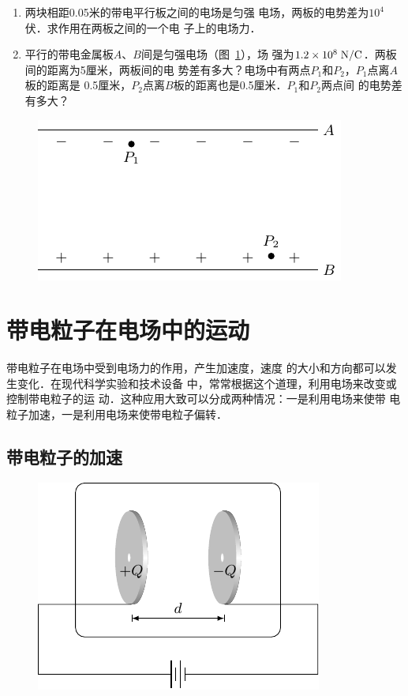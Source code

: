 \begin{enumerate}
    \item 两块相距0.05米的带电平行板之间的电场是匀强
    电场，两板的电势差为$10^4$伏．求作用在两板之间的一个电
    子上的电场力．
    \item 平行的带电金属板$A$、$B$间是匀强电场（图~\ref{fig_B_6-26}），场
    强为$1.2\times10^8\;\text{N}/\text{C}$．两板间的距离为5厘米，两板间的电
    势差有多大？电场中有两点$P_1$和$P_2$，$P_1$点离$A$板的距离是
    0.5厘米，$P_2$点离$B$板的距离也是0.5厘米．$P_1$和$P_2$两点间
    的电势差有多大？
\end{enumerate}

\begin{figure}[htbp]
    \centering
    \includegraphics{fig/B/6-26.pdf}
    \caption{}\label{fig_B_6-26}
\end{figure}    

\section{带电粒子在电场中的运动}

带电粒子在电场中受到电场力的作用，产生加速度，速度
的大小和方向都可以发生变化．在现代科学实验和技术设备
中，常常根据这个道理，利用电场来改变或控制带电粒子的运
动．这种应用大致可以分成两种情况：一是利用电场来使带
电粒子加速，一是利用电场来使带电粒子偏转．

\subsection{带电粒子的加速}
\begin{figure}[htbp]
    \centering
    \includegraphics{fig/B/6-27.pdf}
    \caption{}\label{fig_B_6-27}
\end{figure}

